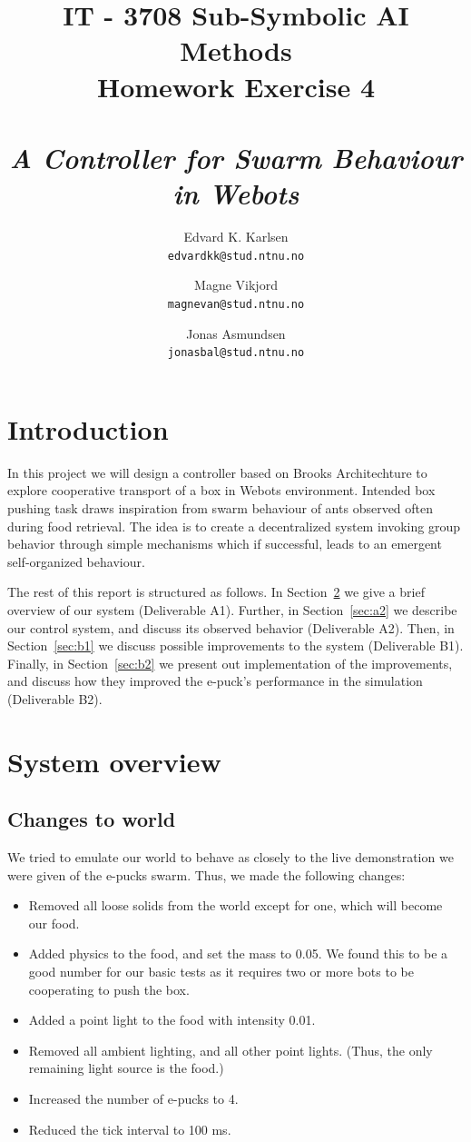 \documentclass[a4paper,10pt]{article}
\title{
    IT - 3708 Sub-Symbolic AI Methods \\
    Homework Exercise 4\\
    ~\\
    \emph{A Controller for Swarm Behaviour in Webots}
}
\author{
    Edvard K. Karlsen \\
    \texttt{edvardkk@stud.ntnu.no}
    \and
    Magne Vikjord \\
    \texttt{magnevan@stud.ntnu.no}
    \and
    Jonas Asmundsen \\
    \texttt{jonasbal@stud.ntnu.no}
}
\date {}
\newcommand{\numbots}{4}
\newcommand{\foodmass}{0.05}
\newcommand{\lightintensity}{0.01}
\newcommand{\tickinterval}{100 ms}
\begin{document}
\maketitle

\section{Introduction}
In this project we will design a controller based on Brooks Architechture to
explore cooperative transport of a box in Webots environment. Intended box
pushing task draws inspiration from swarm behaviour of ants observed often
during food retrieval. The idea is to create a decentralized system invoking
group behavior through simple mechanisms which if successful, leads to an
emergent self-organized behaviour.

The rest of this report is structured as follows. In Section~\ref{sec:a1} we
give a brief overview of our system (Deliverable A1).  Further, in
Section~\ref{sec:a2} we describe our control system, and discuss its observed
behavior (Deliverable A2). Then, in Section~\ref{sec:b1} we discuss possible
improvements to the system (Deliverable B1). Finally, in Section~\ref{sec:b2}
we present out implementation of the improvements, and discuss how they
improved the e-puck's performance in the simulation (Deliverable B2).

\section{System overview}
\label{sec:a1}

\subsection{Changes to world}
We tried to emulate our world to behave as closely to the live demonstration
we were given of the e-pucks swarm. Thus, we made the following changes:

\begin{itemize}
    \item Removed all loose solids from the world except for one, which will
    become our food.
    \item Added physics to the food, and set the mass to \foodmass.
    We found this to be a good number for our basic tests as it
    requires two or more bots to be cooperating to push the box.
    \item Added a point light to the food with intensity \lightintensity.
    \item Removed all ambient lighting, and all other point lights. (Thus, the
    only remaining light source is the food.)
    \item Increased the number of e-pucks to \numbots.
    \item Reduced the tick interval to \tickinterval.
\end{itemize}
\end{document}
